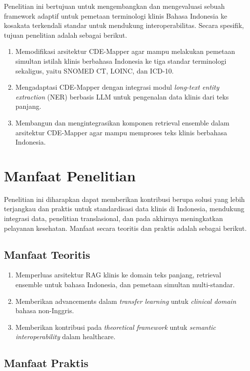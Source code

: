 Penelitian ini bertujuan untuk mengembangkan dan mengevaluasi sebuah framework adaptif untuk pemetaan terminologi klinis Bahasa Indonesia ke kosakata terkendali standar untuk mendukung interoperabilitas. Secara spesifik, tujuan penelitian adalah sebagai berikut.

\begin{enumerate}
    \item Memodifikasi arsitektur CDE-Mapper agar mampu melakukan pemetaan simultan istilah klinis berbahasa Indonesia ke tiga standar terminologi sekaligus, yaitu SNOMED CT, LOINC, dan ICD-10.
    \item Mengadaptasi CDE-Mapper dengan integrasi modul \textit{long-text entity extraction} (NER) berbasis LLM untuk pengenalan data klinis dari teks panjang.
    \item Membangun dan mengintegrasikan komponen retrieval ensemble dalam arsitektur CDE-Mapper agar mampu memproses teks klinis berbahasa Indonesia.
\end{enumerate}

\section{Manfaat Penelitian}

Penelitian ini diharapkan dapat memberikan kontribusi berupa solusi yang lebih terjangkau dan praktis untuk standardisasi data klinis di Indonesia, mendukung integrasi data, penelitian translasional, dan pada akhirnya meningkatkan pelayanan kesehatan. Manfaat secara teoritis dan praktis adalah sebagai berikut.

\subsection{Manfaat Teoritis}

\begin{enumerate}
    \item Memperluas arsitektur RAG klinis ke domain teks panjang, retrieval ensemble untuk bahasa Indonesia, dan pemetaan simultan multi-standar.
    \item Memberikan advancements dalam \textit{transfer learning} untuk \textit{clinical domain} bahasa non-Inggris.
    \item Memberikan kontribusi pada \textit{theoretical framework} untuk \textit{semantic interoperability} dalam healthcare.
\end{enumerate}

\subsection{Manfaat Praktis}

